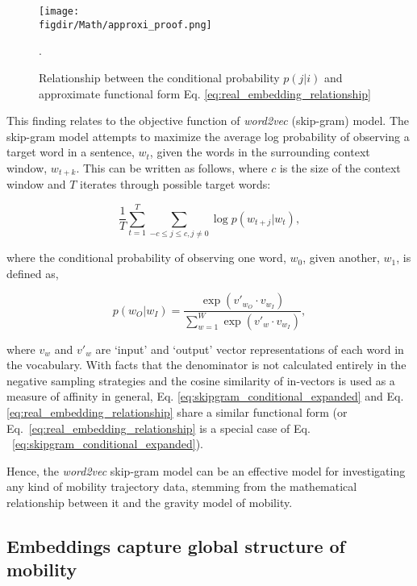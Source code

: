 \documentclass[12pt]{article} %
\def\figdir{../Figs}
\begin{document}
%
%
\begin{figure}
    \centering
    \texttt{[image: \\figdir/Math/approxi\_proof.png]}
    \caption{Relationship between the conditional probability $p(j|i)$ and approximate functional form Eq. \ref{eq:real_embedding_relationship}}.
    \label{fig:real_embedding_relationship}
\end{figure}

This finding relates to the objective function of \textit{word2vec} (skip-gram) model. The skip-gram model attempts to maximize the average log probability of observing a target word in a sentence, $w_{t}$, given the words in the surrounding context window, $w_{t + k}$. This can be written as follows, where $c$ is the size of the context window and $T$ iterates through possible target words:

\begin{equation}
    \label{eq:skipgram_log_prob_condensed}
    \frac{1}{T}\sum_{t=1}^{T} \sum_{-c \le j \le c, j \neq 0} \log p(w_{t+j}|w_t),  
\end{equation}

where the conditional probability of observing one word, $w_{0}$, given another, $w_{1}$, is defined as,

\begin{equation}
    \label{eq:skipgram_conditional_expanded}
    p(w_O|w_I) = \frac{\exp(v'_{w_O} \cdot v_{w_I})}{\sum_{w=1}^{W} \exp(v'_w \cdot v_{w_I})}, 
\end{equation}

where $v_w$ and $v'_w$ are `input' and `output' vector representations of each word in the vocabulary. With facts that the denominator is not calculated entirely in the negative sampling strategies and the cosine similarity of in-vectors is used as a measure of affinity in general, Eq. \ref{eq:skipgram_conditional_expanded} and Eq. \ref{eq:real_embedding_relationship} share a similar functional form (or Eq.~\ref{eq:real_embedding_relationship} is a special case of Eq. ~\ref{eq:skipgram_conditional_expanded}).

Hence, the \textit{word2vec} skip-gram model can be an effective model for investigating any kind of mobility trajectory data, stemming from the mathematical relationship between it and the gravity model of mobility. 


%
%
\subsection*{Embeddings capture global structure of mobility}
\end{document}
